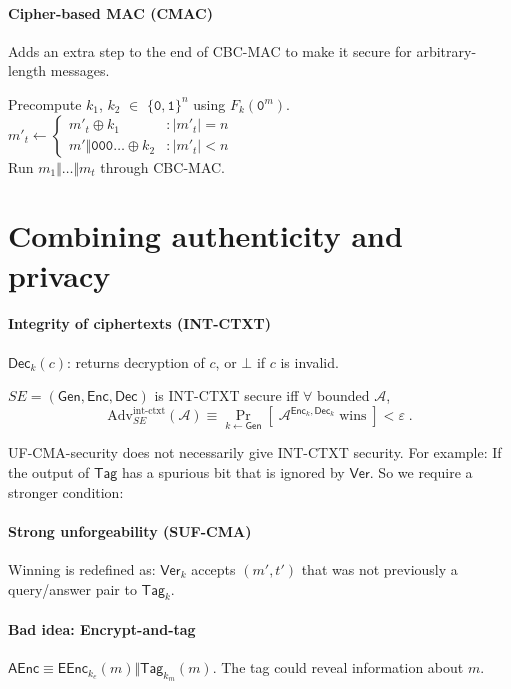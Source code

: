 \documentclass[11pt]{article}
\newcommand{\eqdef}{\ensuremath{\equiv}}
\newcommand{\Gen}{\ensuremath{\mathsf{Gen}}}
\newcommand{\Enc}{\ensuremath{\mathsf{Enc}}}
\newcommand{\AEnc}{\ensuremath{\mathsf{AEnc}}}
\newcommand{\EEnc}{\ensuremath{\mathsf{EEnc}}}
\newcommand{\Dec}{\ensuremath{\mathsf{Dec}}}
\newcommand{\Tag}{\ensuremath{\mathsf{Tag}}}
\newcommand{\Ver}{\ensuremath{\mathsf{Ver}}}
\newcommand{\eps}{\ensuremath{\varepsilon}}
\newcommand{\bit}{\ensuremath{\{\texttt{0},\texttt{1}\}}}
\theoremstyle{remark}
\begin{document}
\paragraph{Cipher-based MAC (CMAC)}
Adds an extra step to the end of CBC-MAC
to make it secure for arbitrary-length messages.

Precompute $k_1$, $k_2$ $\in$ $\bit^n$ using $F_k(\texttt{0}^m)$.\\

$m'_t \leftarrow \begin{cases}
m'_t\oplus k_1 &: |m'_t|=n \\
m' \Vert \texttt{000}\ldots \oplus k_2 &: |m'_t|<n
\end{cases}$\\

Run $m_1 \Vert \ldots \Vert m_t$ through CBC-MAC.

\section{Combining authenticity and privacy}

\paragraph{Integrity of ciphertexts (INT-CTXT)}
$\Dec_k(c)$: returns decryption of $c$, or $\bot$ if $c$ is invalid.

$SE=(\Gen,\Enc,\Dec)$ is INT-CTXT secure iff $\forall$ bounded $\mathcal{A}$,
\[ \text{Adv}_{SE}^\text{int-ctxt}(\mathcal{A}) \eqdef
\Pr_{k\leftarrow\Gen} \left[\;\mathcal{A}^{\Enc_k,\Dec_k}\;\text{wins}\;\right]
< \eps \;\text{.} \]

UF-CMA-security does not necessarily give INT-CTXT security.
For example: If the output of $\Tag$ has a spurious bit that is
ignored by $\Ver$. So we require a stronger condition:

\paragraph{Strong unforgeability (SUF-CMA)}
Winning is redefined as: $\Ver_k$ accepts $(m',t')$
that was not previously a query/answer pair to $\Tag_k$.

\paragraph{Bad idea: Encrypt-and-tag}
$\AEnc \eqdef \EEnc_{k_e}(m) \Vert \Tag_{k_m}(m)$.
The tag could reveal information about $m$.
\end{document}
